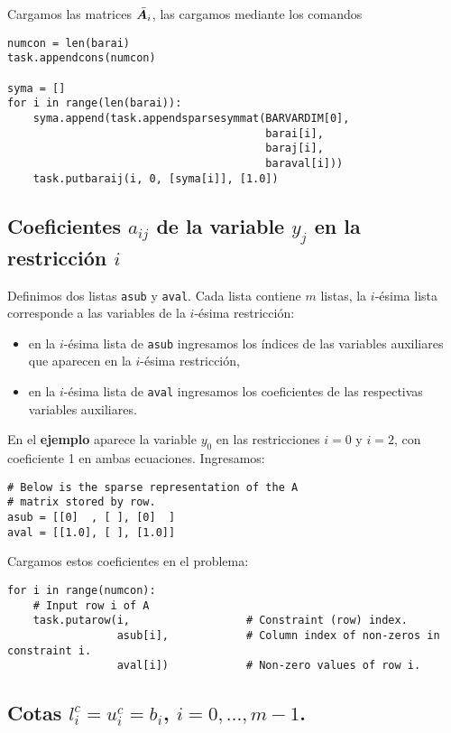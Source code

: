\documentclass[11pt]{article}
\begin{document}
Cargamos las matrices $\bar {\bm{A}}_i$, las cargamos mediante los comandos
\begin{lstlisting}
numcon = len(barai)
task.appendcons(numcon)

syma = []
for i in range(len(barai)):
    syma.append(task.appendsparsesymmat(BARVARDIM[0],
                                        barai[i],
                                        baraj[i],
                                        baraval[i]))
    task.putbaraij(i, 0, [syma[i]], [1.0])
\end{lstlisting}


\subsection{Coeficientes $a_{ij}$ de la variable $y_j$ en la restricción $i$}
Definimos dos listas \texttt{asub} y \texttt{aval}. Cada lista contiene $m$ listas, la $i$-ésima lista corresponde a las variables de la $i$-ésima restricción:
\begin{itemize}
\item en la $i$-ésima lista de \texttt{asub} ingresamos los índices de las variables auxiliares que aparecen en la $i$-ésima restricción,
\item en la $i$-ésima lista de \texttt{aval} ingresamos los coeficientes de las respectivas variables auxiliares.
\end{itemize}

En el \textbf{ejemplo} aparece la variable $y_0$ en las restricciones $i=0$ y $i=2$, con coeficiente 1 en ambas ecuaciones.
Ingresamos:
\begin{lstlisting}
# Below is the sparse representation of the A
# matrix stored by row.
asub = [[0]  , [ ], [0]  ]
aval = [[1.0], [ ], [1.0]]
\end{lstlisting}

Cargamos estos coeficientes en el problema:
\begin{lstlisting}
for i in range(numcon):
    # Input row i of A
    task.putarow(i,                  # Constraint (row) index.
                 asub[i],            # Column index of non-zeros in constraint i.
                 aval[i])            # Non-zero values of row i.
\end{lstlisting}


\subsection{Cotas  $l_i^c = u_i^c = b_i$, $i = 0, \dots, m-1$.}
\end{document}
